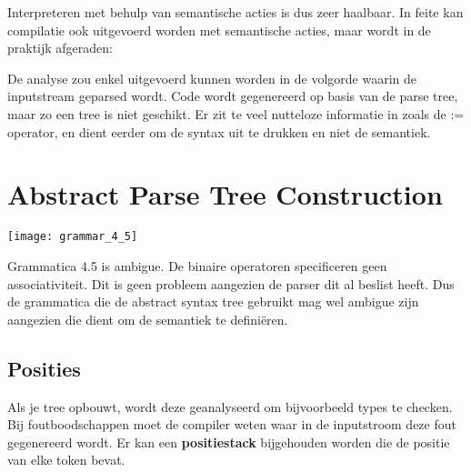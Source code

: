 Interpreteren met behulp van semantische acties is dus zeer haalbaar. In feite kan compilatie ook uitgevoerd worden met semantische acties, maar wordt in de praktijk afgeraden:
\begin{itemize}
	\alert De analyse zou enkel uitgevoerd kunnen worden in de volgorde waarin de inputstream geparsed wordt. 
	\alert Code wordt gegenereerd op basis van de parse tree, maar zo een tree is niet geschikt. Er zit te veel nutteloze informatie in zoals de := operator, en dient eerder om de syntax uit te drukken en niet de semantiek.
\end{itemize}

\section{Abstract Parse Tree Construction}
\begin{grammarfigure}[h]
	\texttt{[image: grammar\_4\_5]}
	\caption{}
	\label{fig:grammar_4_5}
\end{grammarfigure}
Grammatica 4.5 is ambigue. De binaire operatoren specificeren geen associativiteit. Dit is geen probleem aangezien de parser dit al beslist heeft. Dus de grammatica die de abstract syntax tree gebruikt mag wel ambigue zijn aangezien die dient om de semantiek te definiëren.
\subsection{Posities}
Als je tree opbouwt, wordt deze geanalyseerd om bijvoorbeeld types te checken. Bij foutboodschappen moet de compiler weten waar in de inputstroom deze fout gegenereerd wordt. Er kan een \textbf{positiestack} bijgehouden worden die de positie van elke token bevat.